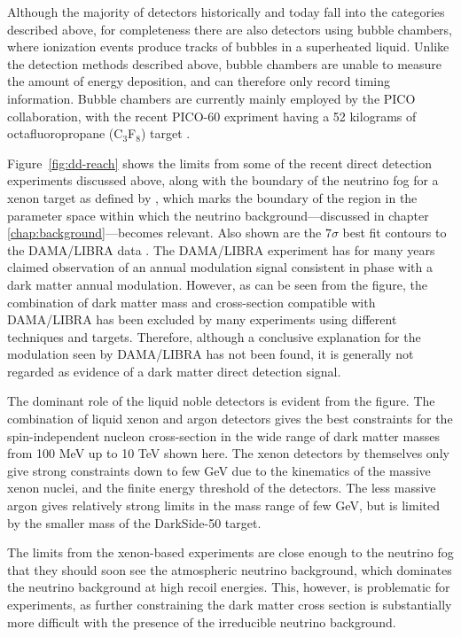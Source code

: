 \documentclass[b5paper, 10pt, twoside]{book}
\begin{document}
Although the majority of detectors historically and today fall into the categories described above, for completeness there are also detectors using bubble chambers, where ionization events produce tracks of bubbles in a superheated liquid. Unlike the detection methods described above, bubble chambers are unable to measure the amount of energy deposition, and can therefore only record timing information. Bubble chambers are currently mainly employed by the PICO collaboration, with the recent PICO-60 expriment having a 52 kilograms of octafluoropropane (C$_3$F$_8$) target \parencite{PICO602019}.

Figure~\ref{fig:dd-reach} shows the limits from some of the recent direct detection experiments discussed above, along with the boundary of the neutrino fog for a xenon target as defined by \textcite{OHare2021}, which marks the boundary of the region in the parameter space within which the neutrino background---discussed in chapter \ref{chap:background}---becomes relevant. Also shown are the $7\sigma$ best fit contours to the DAMA/LIBRA data \parencite{SavageEtAl2009}. The DAMA/LIBRA experiment has for many years claimed observation of an annual modulation signal consistent in phase with a dark matter annual modulation. However, as can be seen from the figure, the combination of dark matter mass and cross-section compatible with DAMA/LIBRA has been excluded by many experiments using different techniques and targets. Therefore, although a conclusive explanation for the modulation seen by DAMA/LIBRA has not been found, it is generally not regarded as evidence of a dark matter direct detection signal.

The dominant role of the liquid noble detectors is evident from the figure. The combination of liquid xenon and argon detectors gives the best constraints for the spin-independent nucleon cross-section in the wide range of dark matter masses from 100 MeV up to 10 TeV shown here. The xenon detectors by themselves only give strong constraints down to few GeV due to the kinematics of the massive xenon nuclei, and the finite energy threshold of the detectors. The less massive argon gives relatively strong limits in the mass range of few GeV, but is limited by the smaller mass of the DarkSide-50 target.

The limits from the xenon-based experiments are close enough to the neutrino fog that they should soon see the atmospheric neutrino background, which dominates the neutrino background at high recoil energies. This, however, is problematic for experiments, as further constraining the dark matter cross section is substantially more difficult with the presence of the irreducible neutrino background.
\end{document}
